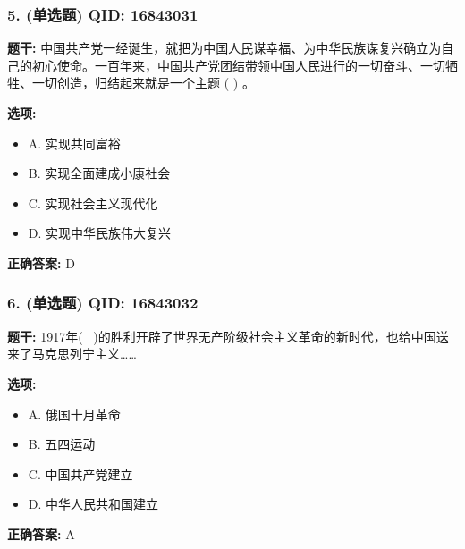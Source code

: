\documentclass[12pt,UTF8]{ctexart}
\begin{document}
\subsubsection*{5. (单选题) \small QID: 16843031}

\textbf{题干:}
中国共产党一经诞生，就把为中国人民谋幸福、为中华民族谋复兴确立为自己的初心使命。一百年来，中国共产党团结带领中国人民进行的一切奋斗、一切牺牲、一切创造，归结起来就是一个主题 ( ) 。

\textbf{选项:}
\begin{itemize}[leftmargin=*]

  \item A. 实现共同富裕

  \item B. 实现全面建成小康社会

  \item C. 实现社会主义现代化

  \item D. 实现中华民族伟大复兴

\end{itemize}

\textbf{正确答案:}
D

\vspace{0.3em}\hrulefill\vspace{0.7em}

\subsubsection*{6. (单选题) \small QID: 16843032}

\textbf{题干:}
1917年(  )的胜利开辟了世界无产阶级社会主义革命的新时代，也给中国送来了马克思列宁主义……

\textbf{选项:}
\begin{itemize}[leftmargin=*]

  \item A. 俄国十月革命

  \item B. 五四运动

  \item C. 中国共产党建立

  \item D. 中华人民共和国建立

\end{itemize}

\textbf{正确答案:}
A

\vspace{0.3em}\hrulefill\vspace{0.7em}
\end{document}
